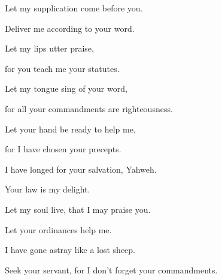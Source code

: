 {\par }{\Q {}Let my supplication come before you.
\par }{\QB Deliver me according to your word.
\par }{\Q {}Let my lips utter praise,
\par }{\QB for you teach me your statutes.
\par }{\Q {}Let my tongue sing of your word,
\par }{\QB for all your commandments are righteousness.
\par }{\Q {}Let your hand be ready to help me,
\par }{\QB for I have chosen your precepts.
\par }{\Q {}I have longed for your salvation, Yahweh.
\par }{\QB Your law is my delight.
\par }{\Q {}Let my soul live, that I may praise you.
\par }{\QB Let your ordinances help me.
\par }{\Q {}I have gone astray like a lost sheep.
\par }{\QB Seek your servant, for I don’t forget your commandments.

\par }
